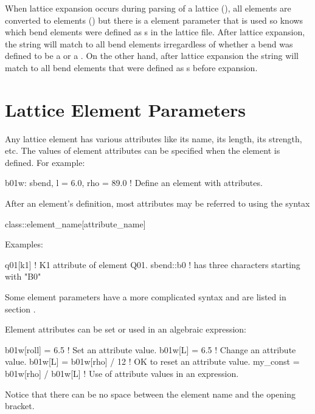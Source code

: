 {{{{{When lattice expansion occurs during parsing of a lattice (), all 
elements are converted to  elements () but there is a  element
parameter that is used so \bmad knows which bend elements were defined as s in the lattice
file. After lattice expansion, the string  will match to all bend elements irregardless
of whether a bend was defined to be a  or a . On the other hand, after lattice
expansion the string  will match to all bend elements that were defined as s
before expansion.

\section{Lattice Element Parameters}
\label{s:lat.attribs}

Any lattice element has various attributes like its name, its length, its strength, etc. The values
of element attributes can be specified when the element is defined. For example:
\begin{example}
  b01w: sbend, l = 6.0, rho = 89.0 ! Define an element with attributes.
\end{example}
After an element's definition, most attributes may be referred to using the syntax
\begin{example}
  class::element_name[attribute_name]
\end{example}
Examples:
\begin{example}
  q01[k1]                       ! K1 attribute of element Q01.
  sbend::b0%
                                !   has three characters starting with "B0"
\end{example}
Some element parameters have a more complicated syntax and are listed in section .

Element attributes can be set or used in an algebraic expression:
\begin{example}
  b01w[roll] = 6.5                  ! Set an attribute value.
  b01w[L] = 6.5                     ! Change an attribute value.
  b01w[L] = b01w[rho] / 12          ! OK to reset an attribute value.
  my_const = b01w[rho] / b01w[L]    ! Use of attribute values in an expression.
\end{example}
Notice that there can be no space between the element name and the \vn{[} opening bracket.

}}}}}

